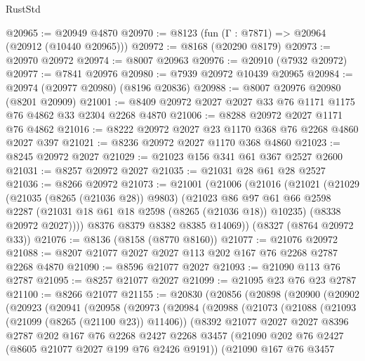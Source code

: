 \begin{lexlean}{RustStd}
\begin{coremodule}
@20965 := @20949 @4870
@20970 := @8123 (fun (Γ : @7871) => @20964 (@20912 (@10440 @20965)))
@20972 := @8168 (@20290 @8179)
@20973 := @20970 @20972
@20974 := @8007 @20963
@20976 := @20910 (@7932 @20972)
@20977 := @7841 @20976
@20980 := @7939 @20972 @10439 @20965
@20984 := @20974 (@20977 @20980) (@8196 @20836)
@20988 := @8007 @20976 @20980 (@8201 @20909)
@21001 := @8409 @20972 @2027 @2027 @33 @76 @1171 @1175 @76 @4862 @33 @2304 @2268 @4870
@21006 := @8288 @20972 @2027 @1171 @76 @4862
@21016 := @8222 @20972 @2027 @23 @1170 @368 @76 @2268 @4860 @2027 @397
@21021 := @8236 @20972 @2027 @1170 @368 @4860
@21023 := @8245 @20972 @2027
@21029 := @21023 @156 @341 @61 @367 @2527 @2600
@21031 := @8257 @20972 @2027
@21035 := @21031 @28 @61 @28 @2527
@21036 := @8266 @20972
@21073 := @21001
    (@21006
      (@21016
        (@21021
          (@21029
            (@21035 (@8265 (@21036 @28)) @9803)
            (@21023
              @86
              @97
              @61
              @66
              @2598
              @2287
              (@21031 @18 @61 @18 @2598 (@8265 (@21036 @18)) @10235)
              (@8338 @20972 @2027))))
        @8376
        @8379
        @8382
        @8385
        @14069))
    (@8327 (@8764 @20972 @33))
@21076 := @8136 (@8158 (@8770 @8160))
@21077 := @21076 @20972
@21088 := @8207 @21077 @2027 @2027 @113 @202 @167 @76 @2268 @2787 @2268 @4870
@21090 := @8596 @21077 @2027
@21093 := @21090 @113 @76 @2787
@21095 := @8257 @21077 @2027
@21099 := @21095 @23 @76 @23 @2787
@21100 := @8266 @21077
@21155 := @20830
    (@20856
      (@20898
        (@20900
          (@20902
            (@20923
              (@20941
                (@20958
                  (@20973
                    (@20984
                      (@20988
                        (@21073
                          (@21088
                            (@21093 (@21099 (@8265 (@21100 @23)) @11406))
                            (@8392
                              @21077
                              @2027
                              @2027
                              @8396
                              @2787
                              @202
                              @167
                              @76
                              @2268
                              @2427
                              @2268
                              @3457
                              (@21090 @202 @76 @2427 (@8605 @21077 @2027 @199 @76 @2426 @9191))
                              (@21090
                                @167
                                @76
                                @3457

\end{coremodule}
\end{lexlean}
